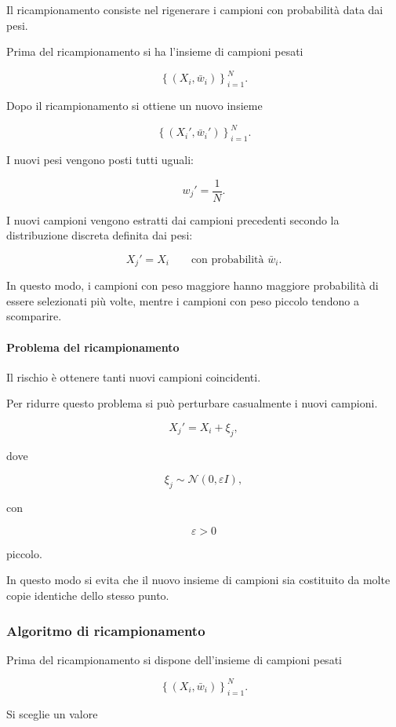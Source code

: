 \documentclass[11pt,a4paper]{article}
\begin{document}
Il ricampionamento consiste nel rigenerare i campioni con probabilità data dai pesi.

Prima del ricampionamento si ha l'insieme di campioni pesati

\[
\left\{(X_i,\bar w_i)\right\}_{i=1}^{N}.
\]

Dopo il ricampionamento si ottiene un nuovo insieme

\[
\left\{(X_i',\bar w_i')\right\}_{i=1}^{N}.
\]

I nuovi pesi vengono posti tutti uguali:

\[
w_j'=\frac{1}{N}.
\]

I nuovi campioni vengono estratti dai campioni precedenti secondo la distribuzione discreta definita dai pesi:

\[
X_j'=X_i
\qquad
\text{con probabilità } \bar w_i.
\]

In questo modo, i campioni con peso maggiore hanno maggiore probabilità di essere selezionati più volte, mentre i campioni con peso piccolo tendono a scomparire.

\paragraph{Problema del ricampionamento}

Il rischio è ottenere tanti nuovi campioni coincidenti.

Per ridurre questo problema si può perturbare casualmente i nuovi campioni.

\[
X_j'=X_i+\xi_j,
\]

dove

\[
\xi_j \sim \mathcal{N}(0,\varepsilon I),
\]

con

\[
\varepsilon>0
\]

piccolo.

In questo modo si evita che il nuovo insieme di campioni sia costituito da molte copie identiche dello stesso punto.



\subsubsection*{Algoritmo di ricampionamento}

Prima del ricampionamento si dispone dell'insieme di campioni pesati

\[
\left\{(X_i,\bar w_i)\right\}_{i=1}^{N}.
\]

Si sceglie un valore
\end{document}
